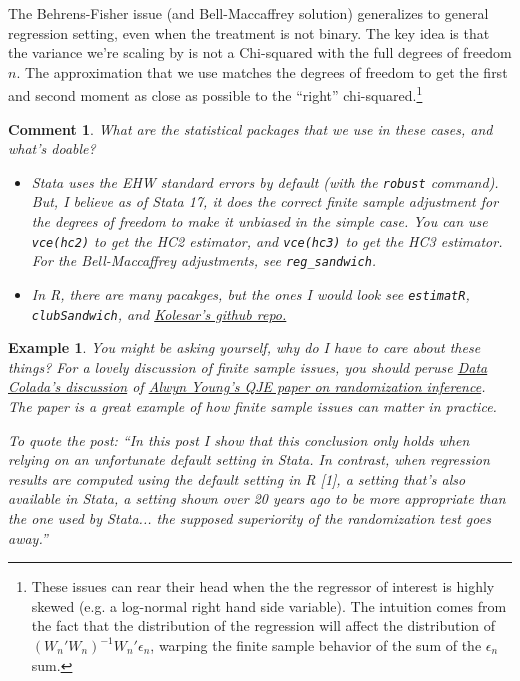 \documentclass{tufte-handout}
\theoremstyle{break}
\newtheorem{exmp}{Example}
\newtheorem{cmt}{Comment}
\begin{document}
The Behrens-Fisher issue (and Bell-Maccaffrey solution) generalizes to general regression setting, even when the treatment is not binary. The key idea is that the variance we're scaling by is not a Chi-squared with the full degrees of freedom $n$. The approximation that we use matches the degrees of freedom to get the first and second moment as close as possible to the ``right'' chi-squared.\footnote{These issues can rear their head when the the regressor of interest is highly skewed (e.g. a log-normal right hand side variable). The intuition comes from the fact that the distribution of the regression will affect the distribution of $(W_{n}'W_{n})^{-1}W_{n}'\epsilon_{n}$, warping the finite sample behavior of the sum of the $\epsilon_{n}$ sum.}


\begin{boxF}
\begin{cmt}
\label{cmt:packages_robust}
What are the statistical packages that we use in these cases, and what's doable?

\begin{itemize}
  \item Stata uses the EHW standard errors by default (with the \texttt{robust} command). But, I believe as of Stata 17, it does the correct finite sample adjustment for the degrees of freedom to make it unbiased in the simple case. You can use \texttt{vce(hc2)} to get the HC2 estimator, and \texttt{vce(hc3)} to get the HC3 estimator. For the Bell-Maccaffrey adjustments,
  see \texttt{reg\_sandwich}.
  \item In R, there are many pacakges, but the ones I would look see \texttt{estimatR},
          \texttt{clubSandwich}, and \href{https://github.com/kolesarm/Robust-Small-Sample-Standard-Errors}{Kolesar's github repo.}
\end{itemize}
        \end{cmt}
      \end{boxF}        

\begin{boxD}
  \begin{exmp}
    You might be asking yourself, why do I have to care about these things? For a lovely discussion of finite sample issues, you should peruse \href{https://datacolada.org/99}{Data Colada's discussion} of \href{https://academic.oup.com/qje/article/134/2/557/5195544?login=true}{Alwyn Young's QJE paper on randomization inference}. The paper is a great example of how finite sample issues can matter in practice.

    \hspace{10pt}To quote the post:
    ``In this post I show that this conclusion only holds when relying on an unfortunate default setting in Stata. In contrast, when regression results are computed using the default setting in R [1], a setting that's also available in Stata, a setting shown over 20 years ago to be more appropriate than the one used by Stata... the supposed superiority of the randomization test goes away.''
  \end{exmp}
  \end{boxD}
\end{document}

